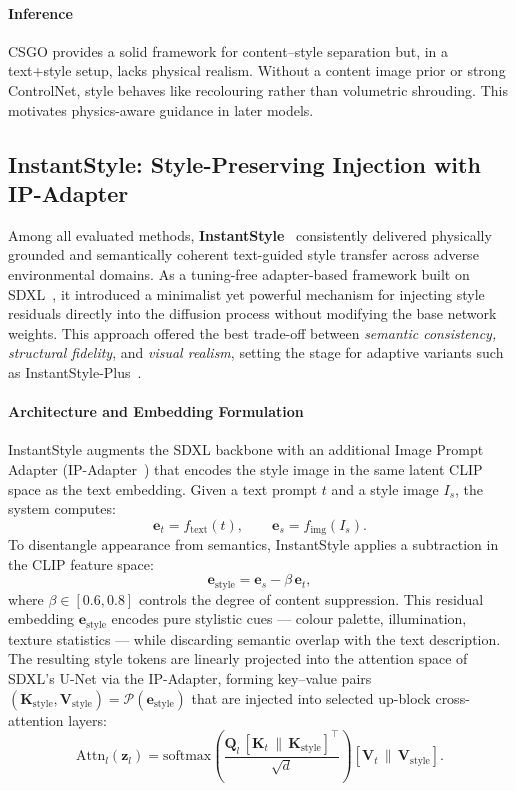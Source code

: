 \paragraph{Inference}
CSGO provides a solid framework for content--style separation but, in a text+style setup, lacks physical realism.
Without a content image prior or strong ControlNet, style behaves like recolouring rather than volumetric shrouding.
This motivates physics-aware guidance in later models.

\subsection{InstantStyle: Style-Preserving Injection with IP-Adapter}
\label{sec:instantstyle}

Among all evaluated methods, \textbf{InstantStyle}~\cite{wang2024instantstyle} consistently delivered physically grounded and semantically coherent text-guided style transfer across adverse environmental domains.
As a tuning-free adapter-based framework built on SDXL~\cite{podell2023sdxlimprovinglatentdiffusion}, it introduced a minimalist yet powerful mechanism for injecting style residuals directly into the diffusion process without modifying the base network weights.
This approach offered the best trade-off between \textit{semantic consistency, structural fidelity}, and \textit{visual realism}, setting the stage for adaptive variants such as InstantStyle-Plus~\cite{wang2024instantstyleplus}.

\paragraph{Architecture and Embedding Formulation}
InstantStyle augments the SDXL backbone with an additional Image Prompt Adapter (IP-Adapter~\cite{ye2023ipadapterfidelityadapters}) that encodes the style image in the same latent CLIP~\cite{radford2021clip} space as the text embedding.
Given a text prompt $t$ and a style image $I_s$, the system computes:
\[
\mathbf{e}_t = f_{\text{text}}(t), \qquad \mathbf{e}_s = f_{\text{img}}(I_s).
\]
To disentangle appearance from semantics, InstantStyle applies a subtraction in the CLIP feature space:
\[
\mathbf{e}_{\text{style}} = \mathbf{e}_s - \beta \, \mathbf{e}_t,
\]
where $\beta \in [0.6, 0.8]$ controls the degree of content suppression.
This residual embedding $\mathbf{e}_{\text{style}}$ encodes pure stylistic cues --- colour palette, illumination, texture statistics --- while discarding semantic overlap with the text description.
The resulting style tokens are linearly projected into the attention space of SDXL's U-Net via the IP-Adapter, forming key--value pairs $(\mathbf{K}_{\text{style}}, \mathbf{V}_{\text{style}}) = \mathcal{P}(\mathbf{e}_{\text{style}})$ that are injected into selected up-block cross-attention layers:
\[
\mathrm{Attn}_l(\mathbf{z}_l)
= \mathrm{softmax}\!\left(\frac{\mathbf{Q}_l \, [\mathbf{K}_t \, \| \, \mathbf{K}_{\text{style}}]^{\!\top}}{\sqrt{d}}\right)
[\mathbf{V}_t \, \| \, \mathbf{V}_{\text{style}}].
\]

